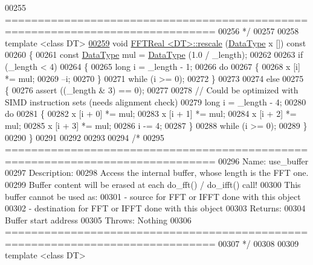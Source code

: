 \begin{DoxyCode}
00255 \textcolor{comment}{==============================================================================}
00256 \textcolor{comment}{*/}
00257 
00258 \textcolor{keyword}{template} <\textcolor{keyword}{class} DT>
\hypertarget{a00096_source_l00259}{}\hyperlink{a00010_a9e30fff775905b1059aa9299004ee228}{00259} \textcolor{keywordtype}{void}    \hyperlink{a00010}{FFTReal <DT>::rescale} (\hyperlink{a00010_a606148f1cf8c3b7d705473932fc063d1}{DataType} x []) \textcolor{keyword}{const}
00260 \{
00261     \textcolor{keyword}{const} \hyperlink{a00010_a606148f1cf8c3b7d705473932fc063d1}{DataType}  mul = \hyperlink{a00010_a606148f1cf8c3b7d705473932fc063d1}{DataType} (1.0 / \_length);
00262 
00263     \textcolor{keywordflow}{if} (\_length < 4)
00264     \{
00265         \textcolor{keywordtype}{long}                i = \_length - 1;
00266         \textcolor{keywordflow}{do}
00267         \{
00268             x [i] *= mul;
00269             --i;
00270         \}
00271         \textcolor{keywordflow}{while} (i >= 0);
00272     \}
00273 
00274     \textcolor{keywordflow}{else}
00275     \{
00276         assert ((\_length & 3) == 0);
00277 
00278         \textcolor{comment}{// Could be optimized with SIMD instruction sets (needs alignment check)}
00279         \textcolor{keywordtype}{long}                i = \_length - 4;
00280         \textcolor{keywordflow}{do}
00281         \{
00282             x [i + 0] *= mul;
00283             x [i + 1] *= mul;
00284             x [i + 2] *= mul;
00285             x [i + 3] *= mul;
00286             i -= 4;
00287         \}
00288         \textcolor{keywordflow}{while} (i >= 0);
00289     \}
00290 \}
00291 
00292 
00293 
00294 \textcolor{comment}{/*}
00295 \textcolor{comment}{==============================================================================}
00296 \textcolor{comment}{Name: use\_buffer}
00297 \textcolor{comment}{Description:}
00298 \textcolor{comment}{    Access the internal buffer, whose length is the FFT one.}
00299 \textcolor{comment}{    Buffer content will be erased at each do\_fft() / do\_ifft() call!}
00300 \textcolor{comment}{    This buffer cannot be used as:}
00301 \textcolor{comment}{        - source for FFT or IFFT done with this object}
00302 \textcolor{comment}{        - destination for FFT or IFFT done with this object}
00303 \textcolor{comment}{Returns:}
00304 \textcolor{comment}{    Buffer start address}
00305 \textcolor{comment}{Throws: Nothing}
00306 \textcolor{comment}{==============================================================================}
00307 \textcolor{comment}{*/}
00308 
00309 \textcolor{keyword}{template} <\textcolor{keyword}{class} DT>

\end{DoxyCode}
